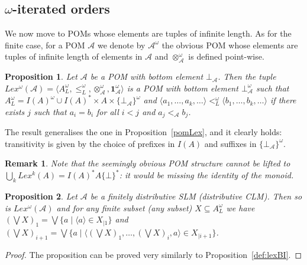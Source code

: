 \documentclass[a4paper]{elsarticle}
\newtheorem{remark}{Remark}
\newtheorem{proposition}{Proposition}
\newcommand{\monop}{\otimes}
\newcommand{\1}{\mathbf{1}}
\begin{document}
\subsection{$\omega$-iterated orders}\label{sec:infinite}
We now move to POMs whose elements are tuples of infinite length.
As for the finite case, for a POM $\mathcal{A}$ we denote by $\mathcal{A}^\omega$
the obvious POM whose elements are tuples of infinite length
of elements in $\mathcal{A}$ and $\otimes^\omega_\mathcal{A}$ is defined point-wise.

\begin{proposition}
Let $\mathcal{A}$ be a POM with bottom element $\bot_\mathcal{A}$.
%
Then the tuple $Lex^\omega(\mathcal{A}) = \langle A_L^\omega, \leq_L^\omega, \monop^\omega_\mathcal{A}, \1^\omega_\mathcal{A} \rangle$ 
is a POM	with bottom element $\bot^\omega_\mathcal{A}$ such that 
$A_L^\omega = I(A)^\omega \cup I(A)^\ast \times A \times \{\bot_\mathcal{A}\}^\omega$
and $\langle a_1, \ldots, a_k, \ldots \rangle <^\omega_L \langle b_1, \ldots, b_k, \ldots \rangle$ if there exists $j$ such that
$a_i = b_i$ for all $i < j$ and %
$a_{j} <_\mathcal{A}  b_{j}$.
\end{proposition}

The result generalises the one in Proposition~\ref{pomLex},
and it clearly holds: transitivity is given by the choice of prefixes in $I(A)$ and suffixes 
in $\{\bot_\mathcal{A}\}^\omega$.

\begin{remark}
	Note that the seemingly obvious POM structure cannot be 
	lifted to $\bigcup_k Lex^k(A) =  I(A)^\ast A \{\bot\}^\ast$: 
	it would be missing the identity of the monoid.
\end{remark}

\begin{proposition}\label{prop:lexiSLM}
	Let $\mathcal{A}$ be a finitely distributive SLM (distributive CLM).
	Then so is $Lex^\omega(\mathcal{A})$
	and for any finite subset (any subset) $X \subseteq A^\omega_L$ 
         we have $(\bigvee X)_1 = \bigvee \{ a \mid \langle a \rangle \in X_{\mid 1}\}$
         and $(\bigvee X)_{i+1} = \bigvee \{ a \mid \langle (\bigvee X)_1, \ldots, (\bigvee X)_i, a \rangle \in X_{\mid i+1}\}$.
\end{proposition}
\begin{proof}
	The proposition can be proved very similarly to Proposition~\ref{def:lexBI}.
\end{proof}
\end{document}
